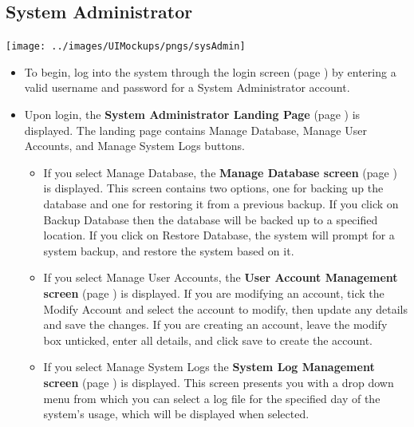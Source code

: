 \documentclass{article}
\begin{document}
\subsection{System Administrator}
\centerline{\texttt{[image: ../images/UIMockups/pngs/sysAdmin]}}
\begin{itemize}
  \item To begin, log into the system through the login screen (page \pageref{login})
    by entering a valid username and password for a System Administrator account.
  \item Upon login, the \textbf{System Administrator Landing Page} (page 
    \pageref{landPg}) is displayed. The landing page contains Manage Database, 
    Manage User Accounts, and Manage System Logs buttons.
    \begin{itemize}
      \item If you select Manage Database, the \textbf{Manage Database screen} 
	(page \pageref{manageDB}) is displayed. This screen contains two 
	options, one for backing up the database and one for restoring it from 
	a previous backup. If you click on Backup Database then the database
	will be backed up to a specified location. If you click on Restore 
	Database, the system will prompt for a system backup, and restore
	the system based on it.
      \item If you select Manage User Accounts, the \textbf{User Account 
	Management screen} (page \pageref{manageAccts}) is displayed. If you are
	modifying an account, tick the Modify Account and select the account to
	modify, then update any details and save the changes. If you are creating an
	account, leave the modify box unticked, enter all details, and click save to
	create the account.
      \item If you select Manage System Logs the \textbf{System Log Management 
	screen} (page \pageref{manageLogs}) is displayed. This screen presents 
	you with a drop down menu from which you can select a log file for the 
	specified day of the system's usage, which will be displayed when selected.
    \end{itemize}
\end{itemize}
\end{document}
